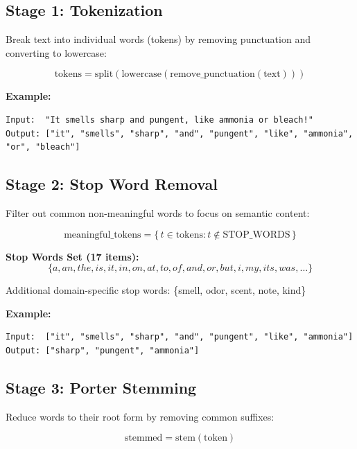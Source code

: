 \documentclass[10pt]{article}
\begin{document}
\subsection{Stage 1: Tokenization}

Break text into individual words (tokens) by removing punctuation and converting to lowercase:

\begin{equation}
\text{tokens} = \text{split}(\text{lowercase}(\text{remove\_punctuation}(\text{text})))
\end{equation}

\textbf{Example:} 
\begin{verbatim}
Input:  "It smells sharp and pungent, like ammonia or bleach!"
Output: ["it", "smells", "sharp", "and", "pungent", "like", "ammonia", "or", "bleach"]
\end{verbatim}

\subsection{Stage 2: Stop Word Removal}

Filter out common non-meaningful words to focus on semantic content:

\begin{equation}
\text{meaningful\_tokens} = \{\, t \in \text{tokens} : t \notin \text{STOP\_WORDS} \,\}
\end{equation}

\textbf{Stop Words Set (17 items):}
\[
\{a, an, the, is, it, in, on, at, to, of, and, or, but, i, my, its, was, \ldots \}
\]

Additional domain-specific stop words: \{smell, odor, scent, note, kind\}

\textbf{Example:}
\begin{verbatim}
Input:  ["it", "smells", "sharp", "and", "pungent", "like", "ammonia"]
Output: ["sharp", "pungent", "ammonia"]
\end{verbatim}

\subsection{Stage 3: Porter Stemming}

Reduce words to their root form by removing common suffixes:

\begin{equation}
\text{stemmed} = \text{stem}(\text{token})
\end{equation}
\end{document}
